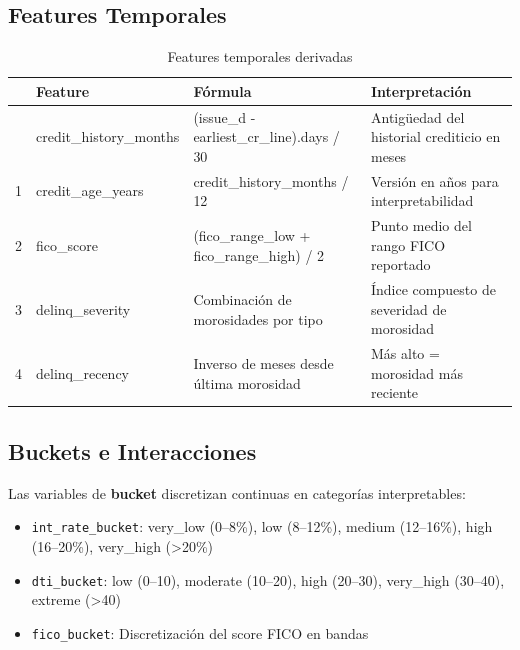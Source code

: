 \documentclass[
  spanish,
  11pt,
  letterpaper,
]{scrbook}
\providecommand{\tightlist}{%
  \setlength{\itemsep}{0pt}\setlength{\parskip}{0pt}}
\theoremstyle{plain}
\theoremstyle{remark}
\begin{document}
\subsection{Features Temporales}\label{features-temporales}

{

\begin{longtable}[]{@{}llll@{}}

\caption{\label{tbl-temporal-features}Features temporales derivadas}

\tabularnewline

\toprule\noalign{}
& Feature & Fórmula & Interpretación \\
\midrule\noalign{}
\endhead
\bottomrule\noalign{}
\endlastfoot
0 & credit\_history\_months & (issue\_d - earliest\_cr\_line).days / 30
& Antigüedad del historial crediticio en meses \\
1 & credit\_age\_years & credit\_history\_months / 12 & Versión en años
para interpretabilidad \\
2 & fico\_score & (fico\_range\_low + fico\_range\_high) / 2 & Punto
medio del rango FICO reportado \\
3 & delinq\_severity & Combinación de morosidades por tipo & Índice
compuesto de severidad de morosidad \\
4 & delinq\_recency & Inverso de meses desde última morosidad & Más alto
= morosidad más reciente \\

\end{longtable}

}

\subsection{Buckets e Interacciones}\label{buckets-e-interacciones}

Las variables de \textbf{bucket} discretizan continuas en categorías
interpretables:

\begin{itemize}
\tightlist
\item
  \texttt{int\_rate\_bucket}: very\_low (0--8\%), low (8--12\%), medium
  (12--16\%), high (16--20\%), very\_high (\textgreater20\%)
\item
  \texttt{dti\_bucket}: low (0--10), moderate (10--20), high (20--30),
  very\_high (30--40), extreme (\textgreater40)
\item
  \texttt{fico\_bucket}: Discretización del score FICO en bandas
\end{itemize}
\end{document}
